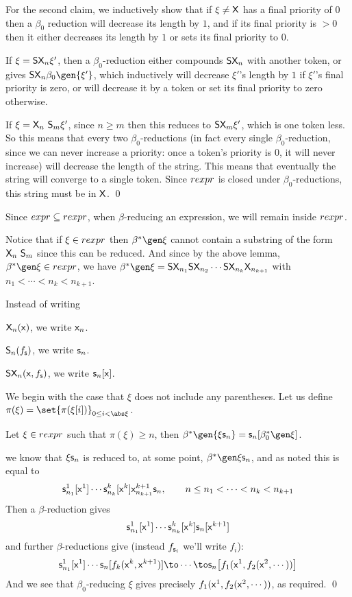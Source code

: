 For the second claim, we inductively show that if $\xi\neq{\sf X}$ has a final priority of $0$ then a $\beta_0$ reduction will decrease its length by $1$, and if its final priority is $>0$ then it either
decreases its length by $1$ or sets its final priority to $0$.
\benum
    \item If $\xi={\sf S}{\sf X}_n\xi'$, then a $\beta_0$-reduction either compounds ${\sf S}{\sf X}_n$ with another token, or gives $\s S\s X_n\beta_0\gen{\xi'}$, which inductively will decrease $\xi'$'s length by $1$
        if $\xi'$'s final priority is zero, or will decrease it by a token or set its final priority to zero otherwise.
    \item If $\xi={\sf X}_n\ {\sf S}_m\xi'$, since $n\geq m$ then this reduces to ${\sf S}{\sf X}_m\xi'$, which is one token less.
\eenum
So this means that every two $\beta_0$-reductions (in fact every single $\beta_0$-reduction, since we can never increase a priority: once a token's priority is $0$, it will never increase) will decrease
the length of the string.
This means that eventually the string will converge to a single token.
Since ${\sl rexpr}$ is closed under $\beta_0$-reductions, this string must be in ${\sf X}$.
\qed

Since ${\sl expr}\subseteq{\sl rexpr}$, when $\beta$-reducing an expression, we will remain inside ${\sl rexpr}$.

Notice that if $\xi\in{\sl rexpr}$ then $\beta^*\gen\xi$ cannot contain a substring of the form ${\sf X}_n\ {\sf S}_m$ since this can be reduced.
And since by the above lemma, $\beta^*\gen\xi\in{\sl rexpr}$, we have $\beta^*\gen\xi=\s S\s X_{n_1}\s S\s X_{n_2}\cdots\s S\s X_{n_k}\s X_{n_{k+1}}$ with $n_1<\cdots<n_k<n_{k+1}$.

Instead of writing
\blist
    \item ${\sf X}_n({\sf x})$, we write ${\sf x}_n$.
    \item ${\sf S}_n(f_{{\sf s}})$, we write ${\sf s}_n$.
    \item ${\sf S}{\sf X}_n({\sf x},f_{{\sf s}})$, we write ${\sf s}_n[{\sf x}]$.
\elist

We begin with the case that $\xi$ does not include any parentheses.
Let us define $\pi(\xi)=\set{\pi(\xi[i])}_{0\leq i<\abs\xi}$.

\lemm
    Let $\xi\in{\sl rexpr}$ such that $\pi(\xi)\geq n$, then $\beta^*\gen{\xi\s s_n}=\s s_n[\beta^*_0\gen\xi]$.
\elemm

\Proof we know that $\xi{\sf s}_n$ is reduced to, at some point, $\beta^*\gen\xi\s s_n$, and as noted this is equal to
$$ {\sf s}_{n_1}^1[{\sf x}^1]\cdots{\sf s}^k_{n_k}[{\sf x}^k]{\sf x}^{k+1}_{n_{k+1}}{\sf s}_n,\qquad n\leq n_1<\cdots<n_k<n_{k+1} $$
Then a $\beta$-reduction gives
$$ {\sf s}^1_{n_1}[{\sf x}^1]\cdots{\sf s}^k_{n_k}[{\sf x}^k]{\sf s}_n[{\sf x}^{k+1}] $$
and further $\beta$-reductions give (instead $f_{{\sf s}_i}$ we'll write $f_i$):
$$ \s s^1_{n_1}[\s x^1]\cdots\s s_n[f_k(\s x^k,\s x^{k+1})] \to \cdots \to \s s_n\bigl[f_1(\s x^1,f_2(\s x^2,\cdots))\bigr] $$
And we see that $\beta_0$-reducing $\xi$ gives precisely $f_1({\sf x}^1,f_2({\sf x}^2,\cdots))$, as required.
\qed

